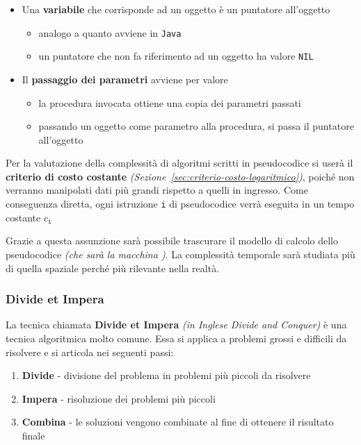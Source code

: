 \documentclass[italian, 10pt]{article}
\begin{document}
\begin{itemize}
\begin{itemize}
\begin{itemize}[label=\(\rightarrow\)]
                \end{itemize}
        \end{itemize}
  \item Una \textbf{variabile} che corrisponde ad un oggetto è un puntatore all'oggetto
        \begin{itemize}
          \item analogo a quanto avviene in \texttt{Java}
          \item un puntatore che non fa riferimento ad un oggetto ha valore \texttt{NIL}
        \end{itemize}
  \item Il \textbf{passaggio dei parametri} avviene per valore
        \begin{itemize}
          \item la procedura invocata ottiene una copia dei parametri passati
          \item passando un oggetto come parametro alla procedura, si passa il puntatore all'oggetto
        \end{itemize}
\end{itemize}

\bigskip
Per la valutazione della complessità di algoritmi scritti in pseudocodice si userà il \textbf{criterio di costo costante} \textit{(Sezione~\ref{sec:criterio-costo-logaritmico})}, poiché non verranno manipolati dati più grandi rispetto a quelli in ingresso.
Come conseguenza diretta, ogni istruzione \texttt{i} di pseudocodice verrà eseguita in un tempo costante \(c_\texttt{i}\)

Grazie a questa assunzione sarà possibile trascurare il modello di calcolo dello pseudocodice \textit{(che sarà la macchina \RAM)}.
La complessità temporale sarà studiata più di quella spaziale perché più rilevante nella realtà.

\subsubsection{Divide et Impera}
\label{sec:divide-et-impera}

La tecnica chiamata \textbf{Divide et Impera} \textit{(in Inglese Divide and Conquer)} è una tecnica algoritmica molto comune.
Essa si applica a problemi grossi e difficili da risolvere e si articola nei seguenti passi:

\begin{enumerate}
  \item \textbf{Divide} - divisione del problema in problemi più piccoli da risolvere
  \item \textbf{Impera} - risoluzione dei problemi più piccoli
  \item \textbf{Combina} - le soluzioni vengono combinate al fine di ottenere il risultato finale
\end{enumerate}
\end{document}
